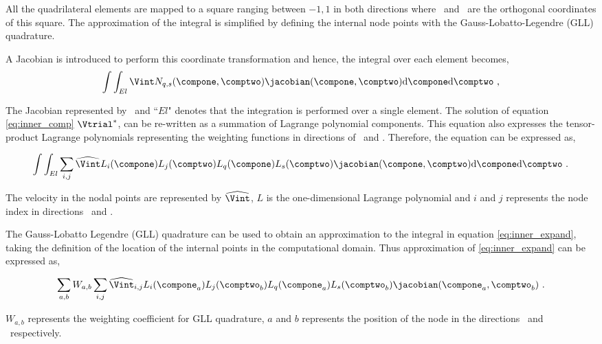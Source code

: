 All the quadrilateral elements are mapped to a square ranging between $-1,1$ in both directions where \compone\ and \comptwo\ are the orthogonal coordinates of this square. The approximation of the integral is simplified by defining the internal node points with the Gauss-Lobatto-Legendre (GLL) quadrature.

A Jacobian is introduced to perform this coordinate transformation and hence, the integral over each element becomes,
\begin{equation} \centering
\label{eq:inner_comp}
\int\int_{El}\Vint N_{q,s}(\compone,\comptwo)\jacobian(\compone, \comptwo)\mathrm{d}\compone \mathrm{d}\comptwo ~,
\end{equation}

The Jacobian represented by \jacobian\ and ``$El$" denotes that the integration is performed over a single element. The solution of equation \ref{eq:inner_comp} $\Vtrial^{*}$, can be re-written as a summation of Lagrange polynomial components. This equation also expresses the tensor-product Lagrange polynomials representing the weighting functions in directions of \compone\ and \comptwo. Therefore, the equation can be expressed as,    

 \begin{equation} \centering
 \label{eq:inner_expand}
 \int\int_{El}\sum_{i,j}\widehat{\Vint}L_{i}(\compone)L_{j}(\comptwo)L_{q}(\compone)L_{s}(\comptwo)\jacobian(\compone, \comptwo)\mathrm{d}\compone \mathrm{d}\comptwo ~.
 \end{equation}
 
 The velocity in the nodal points are represented by $\widehat{\Vint}$, $L$ is the one-dimensional Lagrange polynomial and $i$ and $j$ represents the node index in directions \compone\ and \comptwo. 

The Gauss-Lobatto Legendre (GLL) quadrature can be used to obtain an approximation to the integral in equation \ref{eq:inner_expand}, taking the definition of the location of the internal points in the computational domain. Thus approximation of \ref{eq:inner_expand} can be expressed as,

\begin{equation} \centering
\label{eq:inner_GLL}
\sum_{a,b}W_{a,b}\sum_{i,j}\widehat{\Vint}_{i,j}L_{i}(\compone_{a})L_{j}(\comptwo_{b})L_{q}(\compone_{a})L_{s}(\comptwo_{b})\jacobian(\compone_{a}, \comptwo_{b}) ~.
\end{equation}

$W_{a,b}$ represents the weighting coefficient for GLL quadrature, $a$ and $b$ represents the position of the node in the directions \compone\ and \comptwo\ respectively. 


